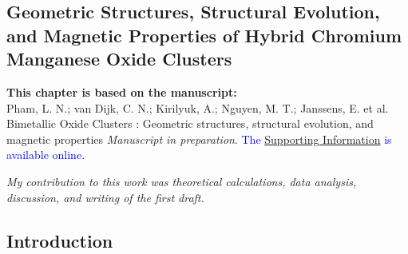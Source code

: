 
\begin{refsection}




\chapter[Bimetallic C\lowercase{r}-M\lowercase{n} Oxide Clusters]{Geometric Structures, Structural Evolution, and Magnetic Properties of Hybrid Chromium Manganese Oxide Clusters} \label{CrMnO}


\begin{shaded}
\textbf{This chapter is based on the manuscript:}\\
Pham, L. N.; van Dijk, C. N.; Kirilyuk, A.; Nguyen, M. T.; Janssens, E. et al. Bimetallic Oxide Clusters : Geometric structures, structural evolution, and magnetic properties \textit{Manuscript in preparation}. \textcolor{blue}{The \href{https://github.com/phamlenhan/PhDDissertation/blob/master/Chapter-8SI-Nhan-thesis-CrMnO.pdf}{Supporting Information} is available online}.

\emph{My contribution to this work was theoretical calculations, data analysis, discussion, and writing of the first draft.}
\newpage
\end{shaded}


\section{Introduction}


\end{refsection}
